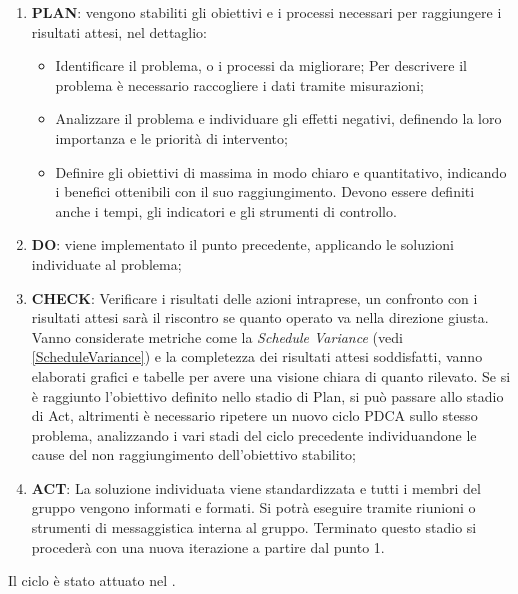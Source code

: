 	\begin{enumerate}
		\item \textbf{PLAN}: vengono stabiliti gli obiettivi e i processi necessari per raggiungere i risultati attesi, nel dettaglio:
		\begin{itemize}
			\item Identificare il problema, o i processi da migliorare; Per descrivere il problema è necessario raccogliere i dati tramite misurazioni;
			\item Analizzare il problema e individuare gli effetti negativi, definendo la loro importanza e le priorità di intervento;
			\item Definire gli obiettivi di massima in modo chiaro e quantitativo, indicando i benefici ottenibili con il suo raggiungimento. Devono essere definiti anche i tempi, gli indicatori e gli strumenti di controllo.
		\end{itemize}				
		\item \textbf{DO}: viene implementato il punto precedente, applicando le soluzioni individuate al problema;
		\item \textbf{CHECK}: Verificare i risultati delle azioni intraprese, un confronto con i risultati attesi sarà il riscontro se quanto operato va nella direzione giusta. Vanno considerate metriche come la \emph{Schedule Variance} (vedi \ref{ScheduleVariance}) e la completezza dei risultati attesi soddisfatti, vanno elaborati grafici e tabelle per avere una visione chiara di quanto rilevato. 
		Se si è raggiunto l'obiettivo definito nello stadio di Plan, si può passare allo stadio di Act, altrimenti è necessario ripetere un nuovo ciclo PDCA sullo stesso problema, analizzando i vari stadi del ciclo precedente individuandone le cause del non raggiungimento dell'obiettivo stabilito;
		\item \textbf{ACT}: La soluzione individuata viene standardizzata  e tutti i membri del gruppo vengono informati e formati. Si potrà eseguire tramite riunioni o strumenti di messaggistica interna al gruppo. Terminato questo stadio si procederà con una nuova iterazione a partire dal punto 1.
	\end{enumerate}

Il ciclo  è stato attuato nel \PianoDiProgetto. 

